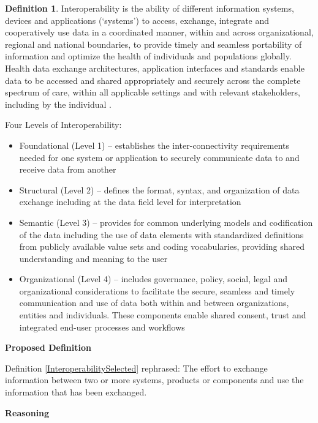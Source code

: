 \documentclass[letterpaper,cleveref]{lipics-v2019}
\theoremstyle{definition}
\newtheorem{defn}{Definition}
\begin{document}
\begin{defn}
Interoperability is the ability of different information systems, devices and
applications (‘systems’) to access, exchange, integrate and cooperatively use
data in a coordinated manner, within and across organizational, regional and
national boundaries, to provide timely and seamless portability of information
and optimize the health of individuals and populations globally. Health data
exchange architectures, application interfaces and standards enable data to be
accessed and shared appropriately and securely across the complete spectrum of
care, within all applicable settings and with relevant stakeholders, including
by the individual \citep{HIMSS2019}.
        
Four Levels of Interoperability:
\begin{itemize}
\item Foundational (Level 1) – establishes the inter-connectivity requirements
needed for one system or application to securely communicate data to and receive
data from another

\item Structural (Level 2) – defines the format, syntax, and organization of
data exchange including at the data field level for interpretation

\item Semantic (Level 3) – provides for common underlying models and
codification of the data including the use of data elements with standardized
definitions from publicly available value sets and coding vocabularies,
providing shared understanding and meaning to the user

\item Organizational (Level 4) – includes governance, policy, social, legal and
organizational considerations to facilitate the secure, seamless and timely
communication and use of data both within and between organizations, entities
and individuals. These components enable shared consent, trust and integrated
end-user processes and workflows
\end{itemize}
\end{defn}

\noindent \textbf{Proposed Definition}

Definition \ref{InteroperabilitySelected}
rephrased: The effort to exchange information between two or more systems,
products or components and use the information that has been exchanged.

\noindent \textbf{Reasoning}
\end{document}
